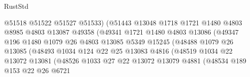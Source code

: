 \begin{lexlean}{RustStd}
\begin{coremodule}
                                  @51518
                                  @51522
                                  @51527
                                  @51533)
                                (@51443
                                  @13048
                                  @1718
                                  @1721
                                  @1480
                                  @4803
                                  @8985
                                  @4803
                                  @13087
                                  @49358
                                  (@49341
                                    @1721
                                    @1480
                                    @4803
                                    @13086
                                    (@49347
                                      @196
                                      @1480
                                      @1079
                                      @26
                                      @4803
                                      @13085
                                      @5349
                                      @15245
                                      (@48488
                                        @1079
                                        @26
                                        @13085
                                        (@48493
                                          @1034
                                          @124
                                          @22
                                          @25
                                          @13083
                                          @4816
                                          (@48519
                                            @1034
                                            @22
                                            @13072
                                            @13081
                                            (@48526
                                              @1033
                                              @27
                                              @22
                                              @13072
                                              @13079
                                              @4881
                                              (@48534
                                                @189
                                                @153
                                                @22
                                                @26
                                                @6721

\end{coremodule}
\end{lexlean}
